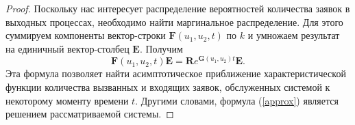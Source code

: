 \begin{proof}
Поскольку нас интересует распределение вероятностей количества заявок в выходных процессах, необходимо найти маргинальное распределение. Для этого суммируем компоненты вектор-строки $\boldsymbol{F}(u_{1},u_{2},t)$ по $k$ и умножаем результат на единичный вектор-столбец $\boldsymbol{E}$. Получим
\begin{equation}\label{approx}
	\boldsymbol{F}(u_{1},u_{2},t)\boldsymbol{E}=\boldsymbol{R}e^{\boldsymbol{G}(u_{1},u_{2})t}\boldsymbol{E}.
\end{equation}
Эта формула позволяет найти асимптотическое приближение характеристической функции количества вызванных и входящих заявок, обслуженных системой к некоторому моменту времени $t$. Другими словами, формула (\ref{approx}) является решением рассматриваемой системы. 
\end{proof}